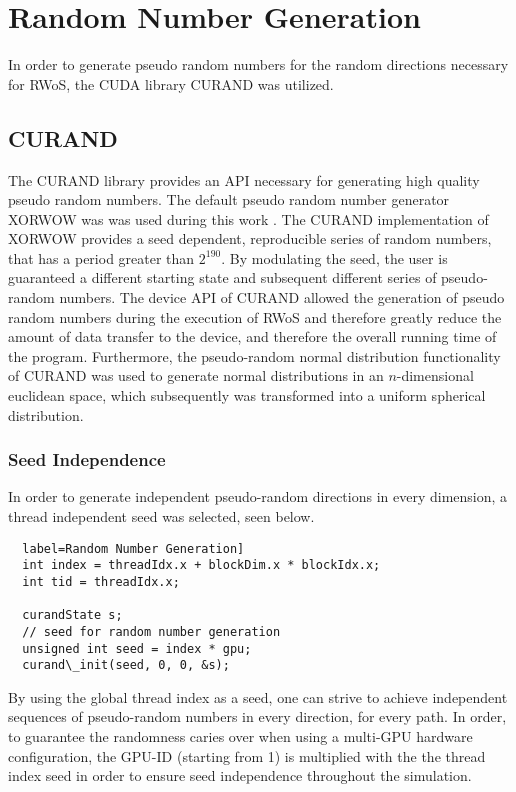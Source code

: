 \section{Random Number Generation}
In order to generate pseudo random numbers for the random directions necessary
for \Gls{RWoS}, the \Gls{CUDA} library \Gls{CURAND} was utilized.
\subsection{CURAND}
The \Gls{CURAND} library provides an API necessary for generating high quality
pseudo random numbers.  The default pseudo random number generator XORWOW was
was used during this work \cite{xorwow}.  The CURAND implementation of XORWOW provides
a seed dependent, reproducible series of random numbers, that has
a period greater than $2^{190}$. By modulating the seed, the user is guaranteed a
different starting state and subsequent different series of pseudo-random numbers.
The device API of \Gls{CURAND} allowed
the generation of pseudo random numbers during the execution of \Gls{RWoS} and
therefore greatly reduce the amount of data transfer to the device, and therefore
the overall running time of the program.  Furthermore, the pseudo-random normal
distribution functionality of \Gls{CURAND} was used to generate normal distributions
in an $n$-dimensional euclidean space, which subsequently was transformed into a uniform spherical
distribution.
\subsubsection{Seed Independence}
In order to generate independent pseudo-random directions in every dimension,
a thread independent seed was selected, seen below.
\begin{verbatim}
  label=Random Number Generation]
  int index = threadIdx.x + blockDim.x * blockIdx.x;
  int tid = threadIdx.x;

  curandState s;
  // seed for random number generation
  unsigned int seed = index * gpu;
  curand\_init(seed, 0, 0, &s);
  \end{verbatim}
By using the global thread index as a seed, one can strive to achieve independent
sequences of pseudo-random numbers in every direction, for every path.  In order,
to guarantee the randomness caries over when using a multi-GPU hardware configuration,
the GPU-ID (starting from 1) is multiplied with the the thread index seed in order
to ensure seed independence throughout the simulation.





